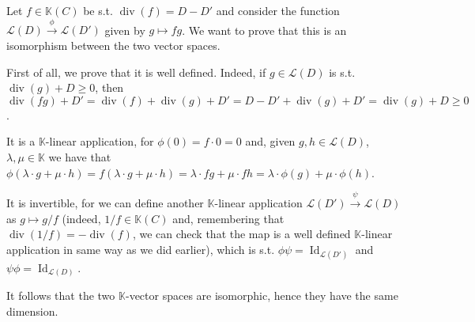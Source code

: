 \documentclass{article}
\newcommand{\numberset}{\mathbb}
\newcommand{\K}{\numberset{K}}
\DeclareMathOperator{\Id}{Id}
\DeclareMathOperator{\divr}{div}
\begin{document}
Let $f\in\K(C)$ be s.t. $\divr(f)=D-D'$ and consider the function
$\mathcal{L}(D)\xrightarrow{\phi}\mathcal{L}(D')$ given by $g\mapsto fg$. We
want to prove that this is an isomorphism between the two vector spaces.

First of all, we prove that it is well defined. Indeed, if $g\in\mathcal{L}(D)$
is s.t. $\divr(g)+D\geq 0$, then
$\divr(fg)+D'=\divr(f)+\divr(g)+D'=D-D'+\divr(g)+D'=\divr(g)+D\geq 0$.

It is a $\K$-linear application, for $\phi(0)=f\cdot 0=0$ and, given $g,h\in
\mathcal{L}(D)$, $\lambda,\mu\in\K$ we have that $\phi(\lambda\cdot g+\mu\cdot 
h)=f(\lambda\cdot g+\mu\cdot h)=\lambda\cdot fg+\mu\cdot fh=\lambda\cdot\phi(g)+
\mu\cdot\phi(h)$.

It is invertible, for we can define another $\K$-linear application
$\mathcal{L}(D')\xrightarrow{\psi}\mathcal{L}(D)$ as $g\mapsto g/f$
(indeed, $1/f\in\K(C)$ and, remembering that $\divr(1/f)=-\divr(f)$, we can
check that the map is a well defined
$\K$-linear application in same way as we did earlier), which is s.t. $\phi\psi=
\Id_{\mathcal{L}(D')}$ and $\psi\phi=\Id_{\mathcal{L}(D)}$.

It follows that the two $\K$-vector spaces are isomorphic, hence they have the
same dimension.


\printbibliography
\end{document}
